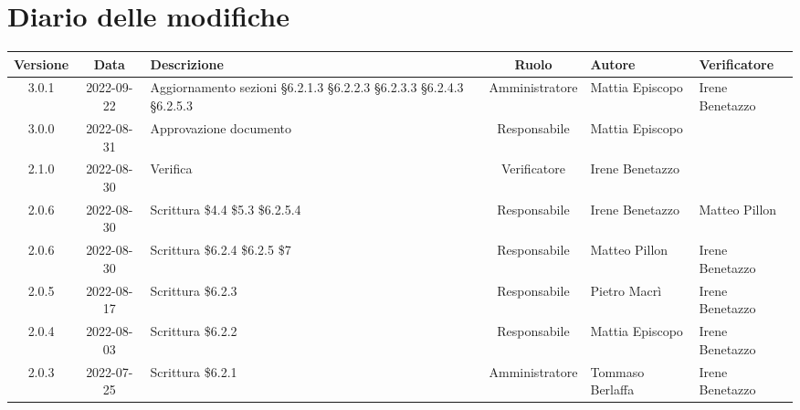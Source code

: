 \section*{Diario delle modifiche}
	\begin{center}
	\renewcommand{\arraystretch}{1.8} %
	\begin{longtable}{ |c|c|p{8em}|c|m{5em}|m{5em}| }
	\hline
	\textbf{Versione} & \textbf{Data} & \textbf{Descrizione} &  \textbf{Ruolo} &  \textbf{Autore} & \textbf{Verificatore}\\ %
	\hline %
	3.0.1 & 2022-09-22 & Aggiornamento sezioni §6.2.1.3 §6.2.2.3 §6.2.3.3 §6.2.4.3 §6.2.5.3 & Amministratore & Mattia \newline Episcopo & Irene \newline Benetazzo \\
	\hline
	3.0.0 & 2022-08-31 & Approvazione documento & Responsabile & Mattia \newline Episcopo & \\
	\hline
	2.1.0 & 2022-08-30 & Verifica & Verificatore & Irene \newline Benetazzo & \\
	\hline 
	2.0.6 & 2022-08-30 & Scrittura \$4.4 \$5.3 \$6.2.5.4 & Responsabile & Irene \newline Benetazzo & Matteo \newline Pillon  \\	
	\hline
	2.0.6 & 2022-08-30 & Scrittura \$6.2.4 \$6.2.5 \$7 & Responsabile & Matteo \newline Pillon & Irene \newline Benetazzo  \\	
	\hline
	2.0.5 & 2022-08-17 & Scrittura \$6.2.3 & Responsabile & Pietro \newline Macrì & Irene \newline Benetazzo  \\	
	\hline
	2.0.4 & 2022-08-03 & Scrittura \$6.2.2 & Responsabile & Mattia \newline Episcopo & Irene \newline Benetazzo  \\	
	\hline
	2.0.3 & 2022-07-25 & Scrittura \$6.2.1 & Amministratore & Tommaso \newline Berlaffa & Irene \newline Benetazzo  \\

\end{longtable}
\end{center}
